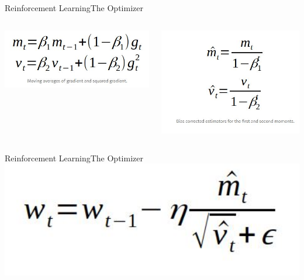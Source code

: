 \documentclass{beamer}
\begin{document}
\begin{frame}{Reinforcement Learning}{The Optimizer \vphantom{(y}}
\vspace{-0.7em}
\begin{columns}
    \begin{column}{0.48\textwidth}
        \includegraphics[width=1\textwidth]{images/adam_unbiased.JPG}
    \end{column}
    \begin{column}{0.48\textwidth}
        \includegraphics[width=1\textwidth]{images/adam_bias.JPG}
    \end{column}
\end{columns}
\end{frame}

\begin{frame}{Reinforcement Learning}{The Optimizer \vphantom{(y}}
\vspace{-0.7em}
\includegraphics[width=1\textwidth]{images/adam_update.JPG}

\end{frame}
\end{document}
